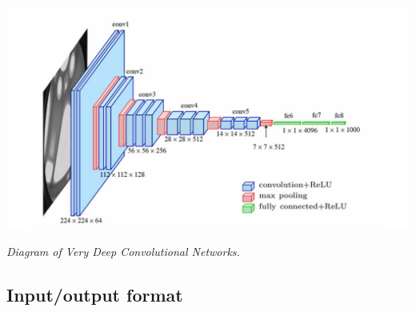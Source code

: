 \vspace{1em}
\begin{center} 
    \includegraphics[width = \textwidth]{../assets/03-model-architecture/cnn-diagram.png}

    \small\textit{Diagram of Very Deep Convolutional Networks. \cite{vcg2021}}
\end{center}
\vspace{1em}

\subsection{Input/output format}

